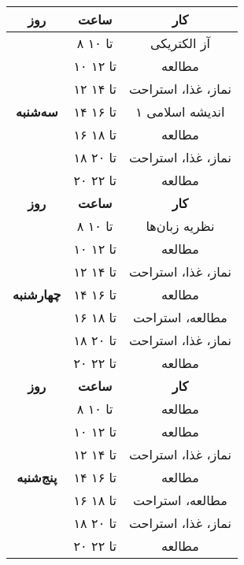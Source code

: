 \documentclass{article}
\begin{document}
\begin{center}
\begin{longtable}{|c|c|c|}
				\textbf{روز} & \textbf{ساعت} & \textbf{کار} \\
				\hline
			
				\multirow{7}{*}{\textbf{سه‌شنبه}} 				
			    & ۸ تا ۱۰ & آز الکتریکی \\
				\cline{2-3}				
				& ۱۰ تا ۱۲ & مطالعه \\
				\cline{2-3}				
				& ۱۲ تا ۱۴ & نماز، غذا، استراحت \\
				\cline{2-3}				
				& ۱۴ تا ۱۶ & اندیشه اسلامی ۱ \\
				\cline{2-3}				
				& ۱۶ تا ۱۸ & مطالعه \\
				\cline{2-3}				
				& ۱۸ تا ۲۰ & نماز، غذا، استراحت \\
				\cline{2-3}				
				& ۲۰ تا ۲۲ & مطالعه \\
		      	\hline
		      	
				\newpage
				
				\hline
				\textbf{روز} & \textbf{ساعت} & \textbf{کار} \\
				\hline
			
				\multirow{7}{*}{\textbf{چهارشنبه}} 				
			    & ۸ تا ۱۰ & نظریه زبان‌ها \\ 
			    \cline{2-3}
			    & ۱۰ تا ۱۲ & مطالعه \\
				\cline{2-3}				
				& ۱۲ تا ۱۴ & نماز، غذا، استراحت \\
				\cline{2-3}				
				& ۱۴ تا ۱۶ & مطالعه \\
				\cline{2-3}				
				& ۱۶ تا ۱۸ & مطالعه، استراحت \\
				\cline{2-3}				
				& ۱۸ تا ۲۰ & نماز، غذا، استراحت \\
				\cline{2-3}				
				& ۲۰ تا ۲۲ & مطالعه \\
				\hline \hline
				
				\textbf{روز} & \textbf{ساعت} & \textbf{کار} \\
				\hline
				
				\multirow{7}{*}{\textbf{پنج‌شنبه}} 				
				& ۸ تا ۱۰ & مطالعه \\ 
				\cline{2-3}
				& ۱۰ تا ۱۲ & مطالعه \\
				\cline{2-3}				
				& ۱۲ تا ۱۴ & نماز، غذا، استراحت \\
				\cline{2-3}				
				& ۱۴ تا ۱۶ & مطالعه \\
				\cline{2-3}				
				& ۱۶ تا ۱۸ & مطالعه، استراحت \\
				\cline{2-3}				
				& ۱۸ تا ۲۰ & نماز، غذا، استراحت \\
				\cline{2-3}				
				& ۲۰ تا ۲۲ & مطالعه \\
				\hline
				
	\end{longtable}
\end{center}
\end{document}
